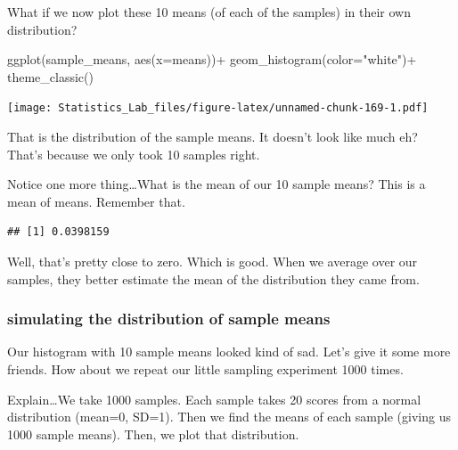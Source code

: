 \documentclass[
]{book}
\newenvironment{Shaded}{\begin{snugshade}}{\end{snugshade}}
\newcommand{\AttributeTok}[1]{\textcolor[rgb]{0.77,0.63,0.00}{#1}}
\newcommand{\FunctionTok}[1]{\textcolor[rgb]{0.00,0.00,0.00}{#1}}
\newcommand{\NormalTok}[1]{#1}
\newcommand{\SpecialCharTok}[1]{\textcolor[rgb]{0.00,0.00,0.00}{#1}}
\newcommand{\StringTok}[1]{\textcolor[rgb]{0.31,0.60,0.02}{#1}}
\begin{document}
What if we now plot these 10 means (of each of the samples) in their own distribution?

\begin{Shaded}
\begin{Highlighting}[]
 \FunctionTok{ggplot}\NormalTok{(sample\_means, }\FunctionTok{aes}\NormalTok{(}\AttributeTok{x=}\NormalTok{means))}\SpecialCharTok{+}
  \FunctionTok{geom\_histogram}\NormalTok{(}\AttributeTok{color=}\StringTok{"white"}\NormalTok{)}\SpecialCharTok{+}
  \FunctionTok{theme\_classic}\NormalTok{()}
\end{Highlighting}
\end{Shaded}

\texttt{[image: Statistics\_Lab\_files/figure-latex/unnamed-chunk-169-1.pdf]}

That is the distribution of the sample means. It doesn't look like much eh? That's because we only took 10 samples right.

Notice one more thing\ldots What is the mean of our 10 sample means? This is a mean of means. Remember that.

\begin{Shaded}
\end{Shaded}

\begin{verbatim}
## [1] 0.0398159
\end{verbatim}

Well, that's pretty close to zero. Which is good. When we average over our samples, they better estimate the mean of the distribution they came from.

\hypertarget{simulating-the-distribution-of-sample-means}{%
\subsubsection{simulating the distribution of sample means}\label{simulating-the-distribution-of-sample-means}}

Our histogram with 10 sample means looked kind of sad. Let's give it some more friends. How about we repeat our little sampling experiment 1000 times.

Explain\ldots We take 1000 samples. Each sample takes 20 scores from a normal distribution (mean=0, SD=1). Then we find the means of each sample (giving us 1000 sample means). Then, we plot that distribution.
\end{document}
